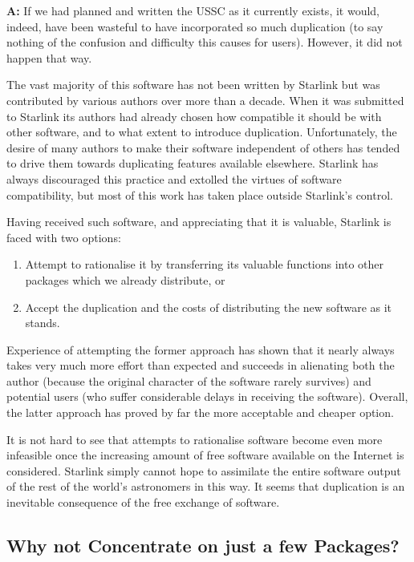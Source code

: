 {\Large \bf A:} If we had planned and written the USSC as it currently
exists, it would, indeed, have been wasteful to have incorporated so
much duplication (to say nothing of the confusion and difficulty this
causes for users). However, it did not happen that way.

The vast majority of this software has not been written by Starlink
but was contributed by various authors over more than a decade.  When
it was submitted to Starlink its authors had already chosen how
compatible it should be with other software, and to what extent to
introduce duplication.  Unfortunately, the desire of many authors to
make their software independent of others has tended to drive them
towards duplicating features available elsewhere. Starlink has always
discouraged this practice and extolled the virtues of software
compatibility, but most of this work has taken place outside
Starlink's control.

\label{illfeeling}Having received such software, and appreciating that
it is valuable, Starlink is faced with two options:

\begin{enumerate}
\item Attempt to rationalise it by transferring its valuable functions
into other packages which we already distribute, or

\item Accept the duplication and the costs of distributing the new
software as it stands.
\end{enumerate}

Experience of attempting the former approach has shown that it nearly
always takes very much more effort than expected and succeeds in
alienating both the author (because the original character of the
software rarely survives) and potential users (who suffer considerable
delays in receiving the software). Overall, the latter approach has
proved by far the more acceptable and cheaper option.

It is not hard to see that attempts to rationalise software become
even more infeasible once the increasing amount of free software
available on the Internet is considered.  Starlink simply cannot hope
to assimilate the entire software output of the rest of the world's
astronomers in this way. It seems that duplication is an inevitable
consequence of the free exchange of software.

\subsection{\label{concentrate}Why not Concentrate on just a few Packages?}

